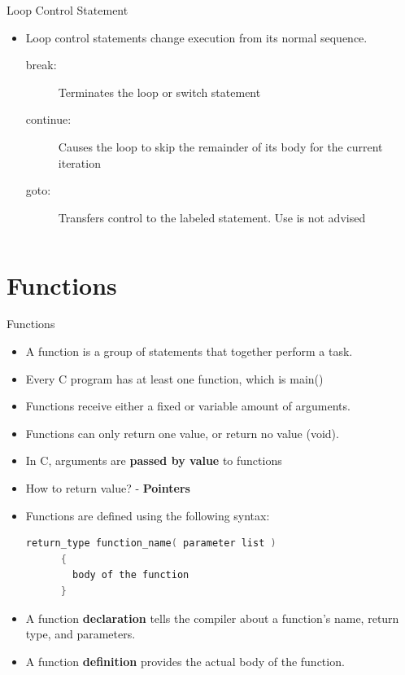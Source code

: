 \documentclass[10pt,t]{beamer}
\begin{document}
\begin{frame}[fragile]
  
\end{frame}

\begin{frame}[fragile]{Loop Control Statement}
  \begin{itemize}
    \item Loop control statements change execution from its normal sequence.
      \begin{description}
        \item[break:] Terminates the loop or switch statement
        \item[continue:] Causes the loop to skip the remainder of its body for the current iteration
        \item[goto:] Transfers control to the labeled statement. Use is not advised
      \end{description}
  \end{itemize}
  \begin{columns}
    
    
  \end{columns}
\end{frame}

\section{Functions}
\begin{frame}[fragile]{Functions}
  \begin{itemize}
  \item A function is a group of statements that together perform a task.
  \item Every C program has at least one function, which is main()
  \item Functions receive either a fixed or variable amount of arguments.
  \item Functions can only return one value, or return no value (void).
  \item In C, arguments are \textbf{passed by value} to functions
  \item How to return value? - \textbf{Pointers}
  \item Functions are defined using the following syntax:
    \begin{lstlisting}[language=C,basicstyle=\scriptsize\ttfamily]
      return_type function_name( parameter list )
      {
        body of the function
      }
    \end{lstlisting}
  \item A function \textbf{declaration} tells the compiler about a function's name, return type, and parameters.
  \item A function \textbf{definition} provides the actual body of the function.
  \end{itemize}
\end{frame}
\end{document}
